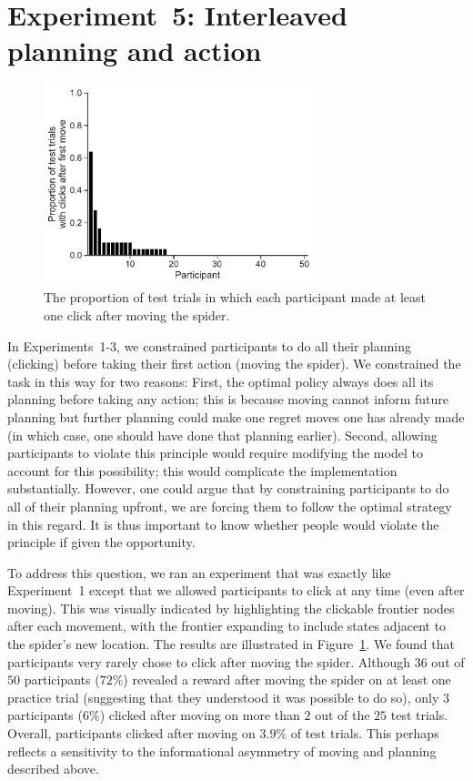 \section{Experiment~5: Interleaved planning and action}\label{app:planning-experiment5}


\begin{figure}[t!]
    \centering
    \includegraphics[width=0.7\textwidth]{figs/planning/interleaved.pdf}
    \caption{ The proportion of test trials in which each participant made at least one click after moving the spider.}
    \label{fig:exp5}
\end{figure}


In Experiments~1-3, we constrained participants to do all their planning (clicking) before taking their first action (moving the spider). We constrained the task in this way for two reasons: First, the optimal policy always does all its planning before taking any action; this is because moving cannot inform future planning but further planning could make one regret moves one has already made (in which case, one should have done that planning earlier). Second, allowing participants to violate this principle would require modifying the model to account for this possibility; this would complicate the implementation substantially. However, one could argue that by constraining participants to do all of their planning upfront, we are forcing them to follow the optimal strategy in this regard. It is thus important to know whether people would violate the principle if given the opportunity.

To address this question, we ran an experiment that was exactly like Experiment~1 except that we allowed participants to click at any time (even after moving). This was visually indicated by highlighting the clickable frontier nodes after each movement, with the frontier expanding to include states adjacent to the spider's new location. The results are illustrated in Figure~\ref{fig:exp5}. We found that participants very rarely chose to click after moving the spider. Although $36$ out of $50$ participants ($72\%$) revealed a reward after moving the spider on at least one practice trial (suggesting that they understood it was possible to do so), only $3$ participants ($6\%$) clicked after moving on more than $2$ out of the $25$ test trials. Overall, participants clicked after moving on $3.9\%$ of test trials. This perhaps reflects a sensitivity to the informational asymmetry of moving and planning described above.


